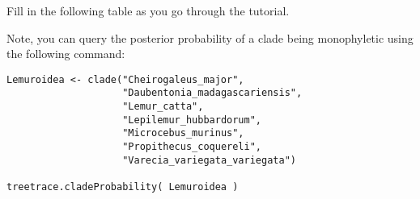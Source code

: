 \pagebreak
\noindent \impmark Fill in the following table as you go through the tutorial.

Note, you can query the posterior probability of a clade being monophyletic using the following command:
{\tt \begin{snugshade*}
\begin{lstlisting}
Lemuroidea <- clade("Cheirogaleus_major", 
                    "Daubentonia_madagascariensis", 
                    "Lemur_catta", 
                    "Lepilemur_hubbardorum",
                    "Microcebus_murinus",
                    "Propithecus_coquereli",
                    "Varecia_variegata_variegata")
                    
treetrace.cladeProbability( Lemuroidea )
\end{lstlisting}
\end{snugshade*}}

